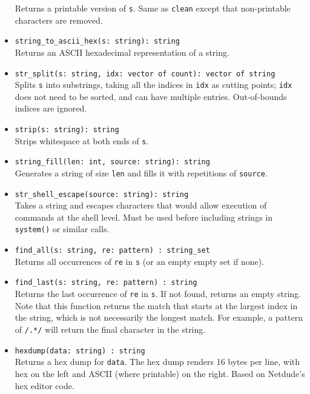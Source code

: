 \documentclass[10pt,landscape]{article}
\begin{document}
\begin{multicols*}{2}
\begin{itemize}
    Returns a printable version of \texttt{s}. Same as \texttt{clean} except
    that non-printable characters are removed.
  \item \verb|string_to_ascii_hex(s: string): string|\\
    Returns an ASCII hexadecimal representation of a string.
  \item \verb|str_split(s: string, idx: vector of count): vector of string|\\
    Splits \texttt{s} into substrings, taking all the indices in
    \texttt{idx} as cutting points; \texttt{idx} does not need to be sorted,
    and can have multiple entries. Out-of-bounds indices are ignored.
  \item \verb|strip(s: string): string|\\
    Strips whitespace at both ends of \texttt{s}.
  \item \verb|string_fill(len: int, source: string): string|\\
    Generates a string of size \texttt{len} and fills it with repetitions of
    \texttt{source}.
  \item \verb|str_shell_escape(source: string): string|\\
    Takes a string and escapes characters that would allow execution of
    commands at the shell level. Must be used before including strings in
    \texttt{system()} or similar calls.
  \item \verb|find_all(s: string, re: pattern) : string_set|\\
    Returns all occurrences of \texttt{re} in \texttt{s} (or an empty empty set
    if none).
  \item \verb|find_last(s: string, re: pattern) : string|\\
    Returns the last occurrence of \texttt{re} in \texttt{s}. If not found,
    returns an empty string.  Note that this function returns the match that
    starts at the largest index in the string, which is not necessarily the
    longest match.  For example, a pattern of \texttt{/.*/} will return the
    final character in the string.
  \item \verb|hexdump(data: string) : string|\\
    Returns a hex dump for \texttt{data}. The hex dump renders 16 bytes per
    line, with hex on the left and ASCII (where printable) on the right. Based
    on Netdude's hex editor code.
\end{itemize}

\end{multicols*}
\end{document}
